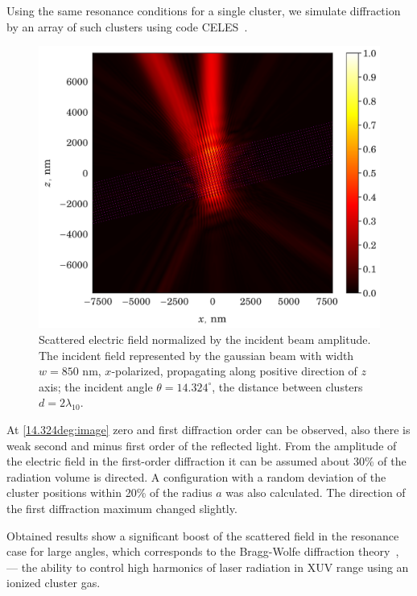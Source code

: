 \documentclass[conference]{IEEEtran}
\begin{document}
Using the same resonance conditions for a single cluster, we simulate diffraction by an array of such clusters using code CELES~\cite{celes}.






\begin{figure}[htbp]
	\centerline{\includegraphics[width=0.71\columnwidth, trim={0 0.15cm 0 0.2cm},clip]{../components/img/celes/TE_14.324deg_check.pdf}}
	\caption{Scattered electric field normalized by the incident beam amplitude. The incident field represented by the gaussian beam with width $w = 850$ nm, $x$-polarized, propagating along positive direction of $z$ axis; the incident angle $\theta = 14.324^{\circ}$, the distance between clusters $d = 2\lambda_{10}$.}
	\label{14.324deg:image}
\end{figure}

At \autoref{14.324deg:image} zero and first diffraction order can be
observed, also there is weak second and minus first order of the reflected light. From the amplitude of the electric field in the first-order diffraction it can be assumed about 30\% of the radiation volume is directed. A configuration with a random deviation of the cluster positions within 20\% of the radius $a$ was also calculated. The direction of the first diffraction maximum changed slightly.

Obtained results show a significant boost of the scattered field in the resonance case for large angles, which corresponds to the Bragg-Wolfe diffraction theory~\cite{boren_huffman}, --- the ability to control high harmonics of laser radiation in XUV range using an ionized cluster gas.



\end{document}
